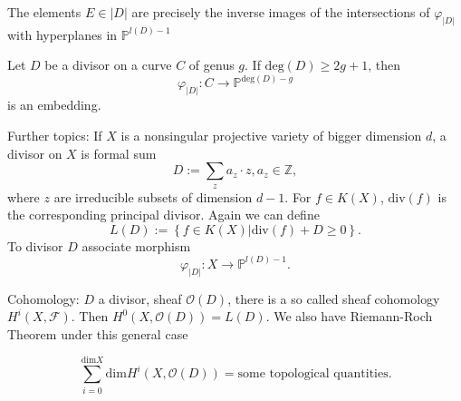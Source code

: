 The elements $E \in |D|$ are precisely the inverse images of the intersections of $\varphi_{|D|}$ with hyperplanes in $\mathbb{P}^{l(D)-1}$

\begin{theorem}
  Let $D$ be a divisor on a curve $C$ of genus $g$. If $\mathrm{deg}(D)\ge 2g+1 $, then 
  \[
    \varphi_{|D|}:C\to \mathbb{P}^{\mathrm{deg}(D)-g}
  \] 
  is an embedding.
\end{theorem}

Further topics:
If $X$ is a nonsingular projective variety of bigger dimension $d$, a divisor on $X$ is formal sum
\[
D:=\sum_{z}a_z \cdot z, a_z \in \mathbb{Z},
\] 
where $z$ are irreducible subsets of dimension $d-1$. For $f \in K(X)$, $\mathrm{div}(f)$ is the corresponding principal divisor. Again we can define 
\[
  L(D):=\left\{f \in  K(X)|\mathrm{div}(f)+D\ge 0\right\} .
\] 
To divisor $D$ associate morphism 
\[
  \varphi_{|D|}:X\to \mathbb{P}^{l(D)-1}.
\]

Cohomology: $D$ a divisor, sheaf $\mathcal{O}(D)$, there is a so called sheaf cohomology $H^{i}(X,\mathcal{F})$. Then $H^0(X,\mathcal{O}(D))=L(D)$.
We also have Riemann-Roch Theorem under this general case
\begin{theorem}
  \[
    \sum_{i=0}^{\mathrm{dim}X} \mathrm{dim}H^{i}\left( X,\mathcal{O}(D) \right) =\text{some topological quantities}.
  \] 
\end{theorem}

